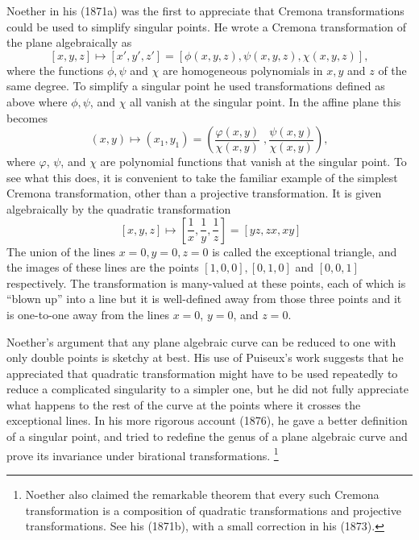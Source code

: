 Noether in his (1871a) was the first to appreciate that Cremona
transformations could be used to simplify singular points.  He wrote a
Cremona transformation of the plane algebraically as
$$
[x,y,z] \mapsto [x',y',z'] = [\phi (x,y,z), \psi (x, y, z),  \chi (x,
y, z)],
$$
where the functions $\phi, \psi$ and $\chi$ are homogeneous polynomials
in $x, y$ and $z$ of the same degree. To simplify a singular point he used
transformations defined as above where $\phi, \psi$, and $\chi$ all
vanish at the singular point.  In the affine plane this becomes
$$(x , y) \mapsto (x_1 , y_1) = \left(\frac{\varphi (x, y)}{\chi (x,
y)}\;,  \frac{\psi (x, y)}{\chi (x, y)} \right),$$
where $\varphi$, $\psi$, and $\chi$ are polynomial functions that vanish
at the singular point.  To see what this does, it is convenient to take
the familiar example of
the simplest  Cremona transformation, other than a projective
transformation. It  is given algebraically by  the quadratic
transformation
\begin{equation}~\label{eq:qt1}
[x, y, z] \mapsto \left[\frac{1}{x}, \frac{1}{y}, \frac{1}{z}\right] =
[yz, zx, xy]\end{equation}
The union of the lines $x=0,y=0,z=0$ is called the exceptional triangle,
and the images of these lines are the points $[1, 0, 0], [0, 1, 0]$
and $[0, 0, 1]$ respectively.
The transformation is many-valued at these points, each of which is
``blown up'' into a line  but it is well-defined away from those three
points and it is  one-to-one away from  the lines $x=0$, $y=0$, and $z
= 0$.


Noether's argument that any plane algebraic curve can be reduced to one
with only double points is sketchy at best. His use of Puiseux's work
suggests that he appreciated that quadratic transformation might have to
be used repeatedly to reduce a complicated singularity to a simpler one,
but he did not  fully appreciate what happens to the rest of the curve at
the points where it crosses the exceptional lines. In his more rigorous
account  (1876),  he gave a better definition of a singular point, and
tried to redefine the genus of a plane algebraic curve and prove its
invariance  under birational  transformations.%
%
\footnote{Noether also
claimed  the remarkable theorem that every such Cremona transformation
is a composition of quadratic transformations and projective
transformations. See his (1871b), with a small correction in his (1873).}


